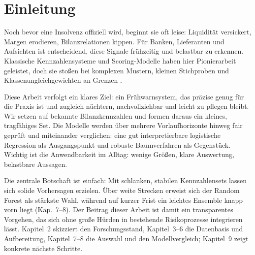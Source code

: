 \chapter{Einleitung}

Noch bevor eine Insolvenz offiziell wird, beginnt sie oft leise: Liquidität versickert, Margen erodieren, Bilanzrelationen kippen. Für Banken, Lieferanten und Aufsichten ist entscheidend, diese Signale 
frühzeitig und belastbar zu erkennen. Klassische Kennzahlensysteme und Scoring-Modelle haben hier Pionierarbeit geleistet, doch sie stoßen bei komplexen Mustern, kleinen Stichproben und 
Klassenungleichgewichten an Grenzen \parencite{altman1968financial,barboza2017machine,saito2015precision}.

Diese Arbeit verfolgt ein klares Ziel: ein Frühwarnsystem, das präzise genug für die Praxis ist und zugleich nüchtern, nachvollziehbar und leicht zu pflegen bleibt. Wir setzen auf bekannte Bilanzkennzahlen und formen daraus ein kleines, tragfähiges Set. Die Modelle werden über mehrere Vorlaufhorizonte hinweg fair geprüft und miteinander verglichen: eine gut interpretierbare logistische Regression als Ausgangspunkt und robuste Baumverfahren als Gegenstück. Wichtig ist die Anwendbarkeit im Alltag: wenige Größen, klare Auswertung, belastbare Aussagen.

Die zentrale Botschaft ist einfach: Mit schlanken, stabilen Kennzahlensets lassen sich solide Vorhersagen erzielen. Über weite Strecken erweist sich der Random Forest als stärkste Wahl, während auf kurzer Frist ein leichtes Ensemble knapp vorn liegt (Kap.~7–8). Der Beitrag dieser Arbeit ist damit ein transparentes Vorgehen, das sich ohne große Hürden in bestehende Risikoprozesse integrieren lässt. Kapitel~2 skizziert den Forschungsstand, Kapitel~3–6 die Datenbasis und Aufbereitung, Kapitel~7–8 die Auswahl und den Modellvergleich; Kapitel~9 zeigt konkrete nächste Schritte.
